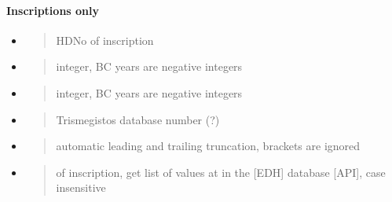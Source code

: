 \documentclass[a4paper,12pt,english]{sphinxhowto}
\begin{document}
\paragraph{Inscriptions only}
\label{\detokenize{Epigraphic:inscriptions-only}}\begin{itemize}
\item {} 
\begin{quote}

HD\sphinxhyphen{}No of inscription
\end{quote}

\item {} 
\begin{quote}

integer, BC years are negative integers
\end{quote}

\item {} 
\begin{quote}

integer, BC years are negative integers
\end{quote}

\item {} 
\begin{quote}

Trismegistos database number (?)
\end{quote}

\item {} 
\begin{quote}

automatic leading and trailing truncation, brackets are ignored
\end{quote}

\item {} 
\begin{quote}

of inscription, get list of values at 
in the {[}EDH{]} database {[}API{]}, case insensitive
\end{quote}

\end{itemize}
\end{document}
